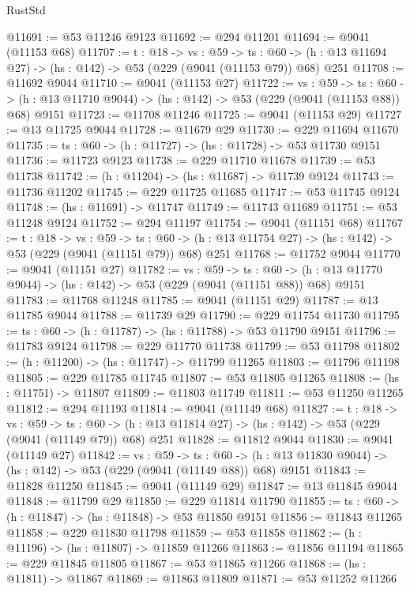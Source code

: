 \begin{lexlean}{RustStd}
\begin{coremodule}
@11691 := @53 @11246 @9123
@11692 := @294 @11201
@11694 := @9041 (@11153 @68)
@11707 := {t : @18} ->
  {vs : @59} ->
  {ts : @60} -> (h : @13 @11694 @27) -> (hs : @142) -> @53 (@229 (@9041 (@11153 @79)) @68) @251
@11708 := @11692 @9044
@11710 := @9041 (@11153 @27)
@11722 := {vs : @59} ->
  {ts : @60} -> (h : @13 @11710 @9044) -> (hs : @142) -> @53 (@229 (@9041 (@11153 @88)) @68) @9151
@11723 := @11708 @11246
@11725 := @9041 (@11153 @29)
@11727 := @13 @11725 @9044
@11728 := @11679 @29
@11730 := @229 @11694 @11670
@11735 := {ts : @60} -> (h : @11727) -> (hs : @11728) -> @53 @11730 @9151
@11736 := @11723 @9123
@11738 := @229 @11710 @11678
@11739 := @53 @11738
@11742 := (h : @11204) -> (hs : @11687) -> @11739 @9124
@11743 := @11736 @11202
@11745 := @229 @11725 @11685
@11747 := @53 @11745 @9124
@11748 := (hs : @11691) -> @11747
@11749 := @11743 @11689
@11751 := @53 @11248 @9124
@11752 := @294 @11197
@11754 := @9041 (@11151 @68)
@11767 := {t : @18} ->
  {vs : @59} ->
  {ts : @60} -> (h : @13 @11754 @27) -> (hs : @142) -> @53 (@229 (@9041 (@11151 @79)) @68) @251
@11768 := @11752 @9044
@11770 := @9041 (@11151 @27)
@11782 := {vs : @59} ->
  {ts : @60} -> (h : @13 @11770 @9044) -> (hs : @142) -> @53 (@229 (@9041 (@11151 @88)) @68) @9151
@11783 := @11768 @11248
@11785 := @9041 (@11151 @29)
@11787 := @13 @11785 @9044
@11788 := @11739 @29
@11790 := @229 @11754 @11730
@11795 := {ts : @60} -> (h : @11787) -> (hs : @11788) -> @53 @11790 @9151
@11796 := @11783 @9124
@11798 := @229 @11770 @11738
@11799 := @53 @11798
@11802 := (h : @11200) -> (hs : @11747) -> @11799 @11265
@11803 := @11796 @11198
@11805 := @229 @11785 @11745
@11807 := @53 @11805 @11265
@11808 := (hs : @11751) -> @11807
@11809 := @11803 @11749
@11811 := @53 @11250 @11265
@11812 := @294 @11193
@11814 := @9041 (@11149 @68)
@11827 := {t : @18} ->
  {vs : @59} ->
  {ts : @60} -> (h : @13 @11814 @27) -> (hs : @142) -> @53 (@229 (@9041 (@11149 @79)) @68) @251
@11828 := @11812 @9044
@11830 := @9041 (@11149 @27)
@11842 := {vs : @59} ->
  {ts : @60} -> (h : @13 @11830 @9044) -> (hs : @142) -> @53 (@229 (@9041 (@11149 @88)) @68) @9151
@11843 := @11828 @11250
@11845 := @9041 (@11149 @29)
@11847 := @13 @11845 @9044
@11848 := @11799 @29
@11850 := @229 @11814 @11790
@11855 := {ts : @60} -> (h : @11847) -> (hs : @11848) -> @53 @11850 @9151
@11856 := @11843 @11265
@11858 := @229 @11830 @11798
@11859 := @53 @11858
@11862 := (h : @11196) -> (hs : @11807) -> @11859 @11266
@11863 := @11856 @11194
@11865 := @229 @11845 @11805
@11867 := @53 @11865 @11266
@11868 := (hs : @11811) -> @11867
@11869 := @11863 @11809
@11871 := @53 @11252 @11266

\end{coremodule}
\end{lexlean}
